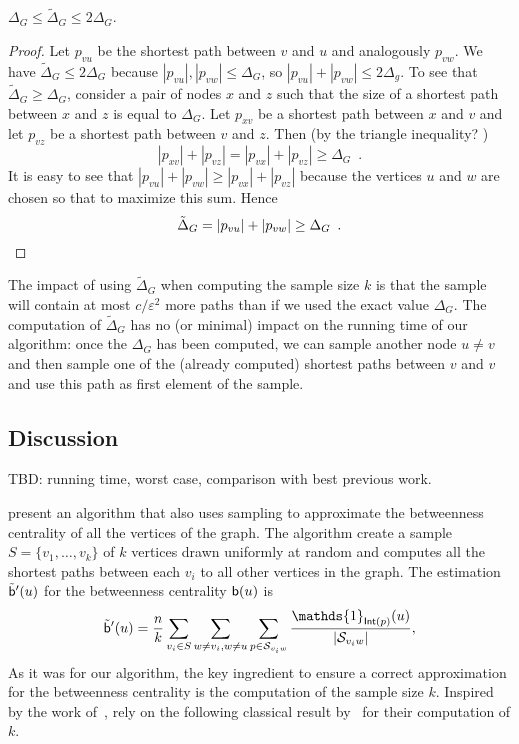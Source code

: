\begin{lemma}\label{lem:diam}
  $\Delta_G\le\tilde\Delta_G\le 2\Delta_G$.
\end{lemma}
\begin{proof}
  Let $p_{vu}$ be the shortest path between $v$ and $u$ and analogously
  $p_{vw}$. We have $\tilde\Delta_G\le 2\Delta_G$ because
  $|p_{vu}|,|p_{vw}|\le\Delta_G$, so $|p_{vu}|+|p_{vw}|\le 2\Delta_g$. To see
  that $\tilde\Delta_G\ge\Delta_G$, consider a pair of nodes $x$ and $z$ such
  that the size of a shortest path between $x$ and $z$ is equal to $\Delta_G$.
  Let $p_{xv}$ be a shortest path between $x$ and $v$ and let $p_{vz}$ be a
  shortest path between $v$ and $z$. 
  Then (by the triangle inequality? \XXX)
  \[
  |p_{xv}|+|p_{vz}|=|p_{vx}|+|p_{vz}|\ge\Delta_G\enspace.
  \]
  It is easy to see that $|p_{vu}|+|p_{vw}|\ge|p_{vx}|+|p_{vz}|$ because the
  vertices $u$ and $w$ are chosen so that to maximize this sum. Hence
  \[
  \tilde\Delta_G = |p_{vu}|+|p_{vw}| \ge\Delta_G\enspace.\qedhere
  \]
\end{proof}

The impact of using $\tilde\Delta_G$ when computing the sample size $k$ is that
the sample will contain at most $c/\varepsilon^2$ more paths than if we used the
exact value $\Delta_G$. The computation of $\tilde\Delta_G$ has no (\XXX or
minimal) impact on the running time of our algorithm: once the $\Delta_G$ has
been computed, we can sample another node $u\neq v$ and then sample one of the
(already computed) shortest paths between $v$ and $v$ and use this path as first
element of the sample.

\subsection{Discussion}
\XXX TBD: running time, worst case, comparison with best previous work.

\citet{BrandesP07} present an algorithm that also uses sampling to approximate
the betweenness centrality of all the vertices of the graph. The algorithm
create a sample $S=\{v_1,\dotsc,v_k\}$ of $k$ vertices drawn uniformly at random 
and computes all the shortest paths between each $v_i$ to all other vertices in
the graph. The estimation $\tilde{\mathsf{b}}'(u)$ for the betweenness centrality
$\mathsf{b}(u)$ is
\[ 
\tilde\betw'(u)= \frac{n}{k}\sum_{v_i\in S}\sum_{w\neq v_i,w\neq
u}\sum_{p\in\mathcal{S}_{v_iw}}\frac{\mathds{1}_{\mathsf{Int}(p)}(u)}{|\mathcal{S}_{v_iw}|},
\]
As it was for our algorithm, the key ingredient to ensure a correct
approximation for the betweenness centrality is the computation of the sample
size $k$. Inspired by the work of~\citet{EppsteinW04}, \citet{BrandesP07} rely
on the following classical result by~\citet{Hoeffding63} for their computation
of $k$.

